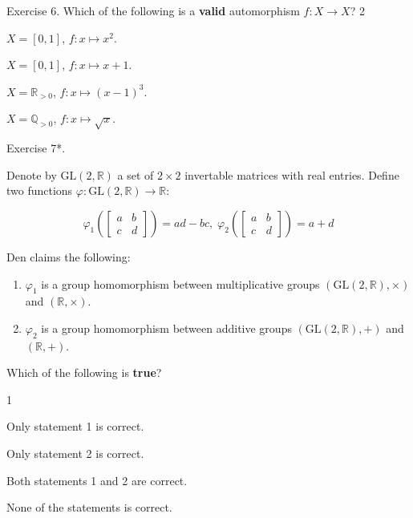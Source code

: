 \documentclass[../lecture-notes-148x210.tex]{subfiles}
\begin{document}
\begin{xexercise}
    {Exercise 6.}
    {Which of the following is a \textbf{valid} automorphism $f: X \to X$?\vspace{-10pt}}
    {2}
    {
        \item $X = [0,1]$, $f: x \mapsto x^2$.
        \item $X = [0,1]$, $f: x \mapsto x + 1$.
        \item $X = \mathbb{R}_{>0}$, $f: x \mapsto (x-1)^3$.
        \item $X = \mathbb{Q}_{>0}$, $f: x \mapsto \sqrt{x}$.
    }
\end{xexercise}

\begin{xexercise}
    {Exercise 7*.}
    {
        Denote by $\text{GL}(2,\mathbb{R})$ a set of $2\times 2$ invertable matrices with real entries. Define 
        two functions $\varphi: \text{GL}(2,\mathbb{R}) \to \mathbb{R}$:
        
        \begin{equation*}
            \varphi_1 \left(\begin{bmatrix}
                a & b \\ c & d
            \end{bmatrix}\right) = ad - bc, \; \varphi_2 \left(\begin{bmatrix}
                a & b \\ c & d
            \end{bmatrix}\right) = a + d
        \end{equation*}
        
        Den claims the following:
        \begin{enumerate}
            \item $\varphi_1$ is a group homomorphism between multiplicative groups $(\text{GL}(2,\mathbb{R}), \times)$ and $(\mathbb{R}, \times)$.
            \item $\varphi_2$ is a group homomorphism between additive groups $(\text{GL}(2, \mathbb{R}), +)$ and $(\mathbb{R}, +)$.
        \end{enumerate}
        
        Which of the following is \textbf{true}?
    }
    {1}
    {
        \item Only statement 1 is correct.
        \item Only statement 2 is correct.
        \item Both statements 1 and 2 are correct.
        \item None of the statements is correct.
    }
\end{xexercise}
\end{document}
